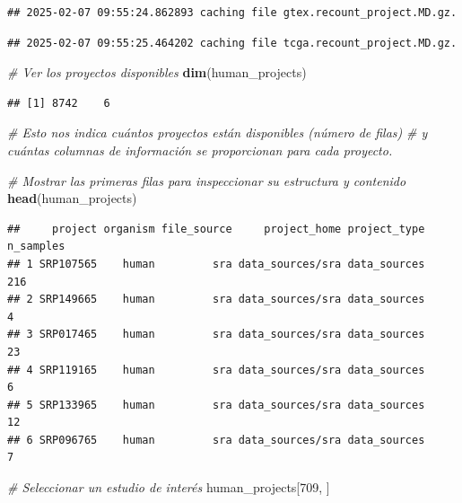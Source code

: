\documentclass[
]{article}
\newenvironment{Shaded}{\begin{snugshade}}{\end{snugshade}}
\newcommand{\CommentTok}[1]{\textcolor[rgb]{0.56,0.35,0.01}{\textit{#1}}}
\newcommand{\DecValTok}[1]{\textcolor[rgb]{0.00,0.00,0.81}{#1}}
\newcommand{\FunctionTok}[1]{\textcolor[rgb]{0.13,0.29,0.53}{\textbf{#1}}}
\newcommand{\NormalTok}[1]{#1}
\begin{document}
\begin{verbatim}
## 2025-02-07 09:55:24.862893 caching file gtex.recount_project.MD.gz.
\end{verbatim}

\begin{verbatim}
## 2025-02-07 09:55:25.464202 caching file tcga.recount_project.MD.gz.
\end{verbatim}

\begin{Shaded}
\begin{Highlighting}[]
\CommentTok{\# Ver los proyectos disponibles}
\FunctionTok{dim}\NormalTok{(human\_projects)}
\end{Highlighting}
\end{Shaded}

\begin{verbatim}
## [1] 8742    6
\end{verbatim}

\begin{Shaded}
\begin{Highlighting}[]
\CommentTok{\# Esto nos indica cuántos proyectos están disponibles (número de filas) }
\CommentTok{\# y cuántas columnas de información se proporcionan para cada proyecto.}

\CommentTok{\# Mostrar las primeras filas para inspeccionar su estructura y contenido}
\FunctionTok{head}\NormalTok{(human\_projects)}
\end{Highlighting}
\end{Shaded}

\begin{verbatim}
##     project organism file_source     project_home project_type n_samples
## 1 SRP107565    human         sra data_sources/sra data_sources       216
## 2 SRP149665    human         sra data_sources/sra data_sources         4
## 3 SRP017465    human         sra data_sources/sra data_sources        23
## 4 SRP119165    human         sra data_sources/sra data_sources         6
## 5 SRP133965    human         sra data_sources/sra data_sources        12
## 6 SRP096765    human         sra data_sources/sra data_sources         7
\end{verbatim}

\begin{Shaded}
\begin{Highlighting}[]
\CommentTok{\# Seleccionar un estudio de interés}
\NormalTok{human\_projects[}\DecValTok{709}\NormalTok{, ]}
\end{Highlighting}
\end{Shaded}
\end{document}
